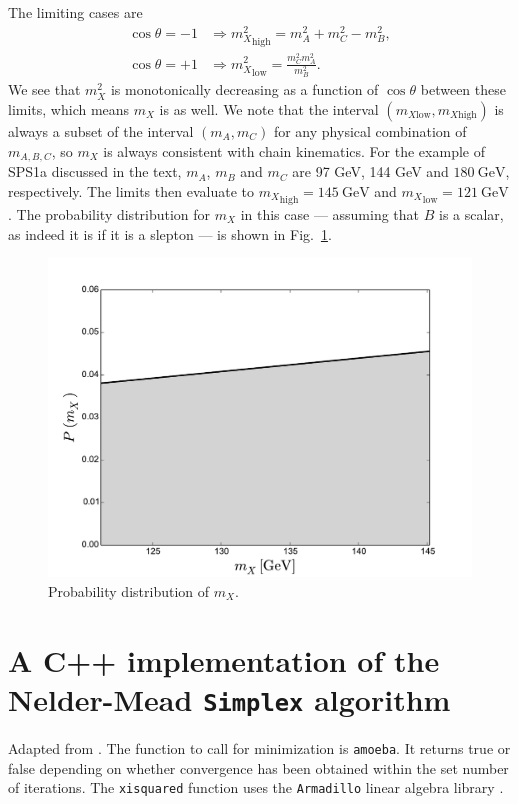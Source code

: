 \documentclass[twoside,english]{uiofysmaster}
\begin{document}
The limiting cases are
\begin{align}
	\cos\theta = -1 &\Rightarrow {m_X^2}_\mathrm{high} = m_A^2 + m_C^2 - m_B^2,\\
	\cos\theta = +1 &\Rightarrow {m_X^2}_\mathrm{low} = \frac{m_C^2 m_A^2}{m_B^2}.\nonumber
\end{align}
We see that $m_X^2$ is monotonically decreasing as a function of $\cos\theta$ between these limits, which means $m_X$ is as well. We note that the interval $(m_{X\mathrm{low}},m_{X\mathrm{high}})$ is always a subset of the interval $(m_A, m_C)$ for any physical combination of $m_{A,B,C}$, so $m_X$ is always consistent with chain kinematics. For the example of SPS1a discussed in the text, $m_A$, $m_B$ and $m_C$ are 97 GeV, 144 GeV and $180~\mathrm{GeV}$, respectively. The limits then evaluate to ${m_X}_\mathrm{high} = 145 ~\mathrm{GeV}$ and ${m_X}_\mathrm{low} = 121 ~\mathrm{GeV}$. The probability distribution for $m_X$ in this case --- assuming that $B$ is a scalar, as indeed it is if it is a slepton --- is shown in Fig.\ \ref{fig:mX-dist}. 
\begin{figure}[hbt]
\centering
\includegraphics[scale=0.6]{figures/appendix/mX-distribution.pdf}
\caption{Probability distribution of $m_X$.}
\label{fig:mX-dist}
\end{figure}

\chapter{A C++ implementation of the Nelder-Mead {\tt Simplex} algorithm}
\label{ch:simplex}
Adapted from \cite{simplex-implementation}. The function to call for minimization is {\tt amoeba}. It returns true or false depending on whether convergence has been obtained within the set number of iterations. The {\tt xisquared} function uses the {\tt Armadillo} linear algebra library \cite{Armadillo}.
\end{document}
